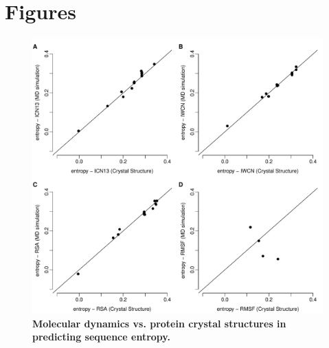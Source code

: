\documentclass[12pt]{article}
\begin{document}

\newpage

\section*{Figures}

            \begin{figure}[t]
            \begin{center}
                \includegraphics[height=0.7\textheight]{cor_cr_md.pdf}
            \end{center}
            \caption{
                     {\bf Molecular dynamics vs. protein crystal structures in predicting sequence entropy.}
}
\end{figure}
\end{document}

